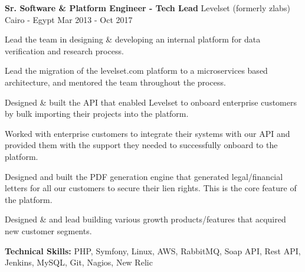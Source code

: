 \begin{cventries}
	\cventry
	{\textbf{Sr. Software \& Platform Engineer - Tech Lead}} %
	{Levelset (formerly zlabs)} %
	{Cairo - Egypt} %
	{Mar 2013 - Oct 2017} %
	{
		\begin{cvitems} %
			\item {Lead the team in designing \& developing an internal platform for data verification
			            and research process.}
			\item {Lead the migration of the levelset.com platform to a microservices based
			            architecture, and mentored the team throughout the process.}
			\item {Designed \& built the API that enabled Levelset to onboard enterprise customers by
			            bulk importing their projects into the platform.}
			\item {Worked with enterprise customers to integrate their systems with our API and provided
			            them with the support they needed to successfully onboard to the platform.}
			\item {Designed and built the PDF generation engine that generated legal/financial letters
			            for all our customers to secure their lien rights. This is the core feature of the
			            platform.}
			\item {Designed \& and lead building various growth products/features that acquired new
			            customer segments.}
			\item {\textbf{Technical Skills:} PHP, Symfony, Linux, AWS, RabbitMQ, Soap API, Rest API,
			            Jenkins, MySQL, Git, Nagios, New Relic}
		\end{cvitems}
	}


\end{cventries}
